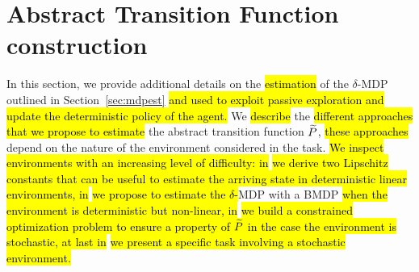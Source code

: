 \section{Abstract Transition Function construction}\label{sec:absmdp}
In this section, we provide additional details on the \hl{estimation} of the $\delta$-MDP outlined in Section~\ref{sec:mdpest} \hl{and used to exploit passive exploration and update the deterministic policy of the agent.} We \hl{describe} the \hl{different approaches that we propose to estimate} the abstract transition function $\widetilde{P}$, \hl{these approaches} depend on the nature of the environment considered in the task. \hl{We inspect environments with an increasing level of difficulty: in}  \hl{we derive two Lipschitz constants that can be useful to estimate the arriving state in deterministic linear environments, in}  \hl{we propose to estimate the $\delta$-}\ac{MDP} with a \ac{BMDP} \hl{when the environment is deterministic but non-linear, in}  \hl{we build a constrained optimization problem to ensure a property of $\widetilde{P}$ in the case the environment is stochastic, at last in}  \hl{we present a specific task involving a stochastic environment.}


